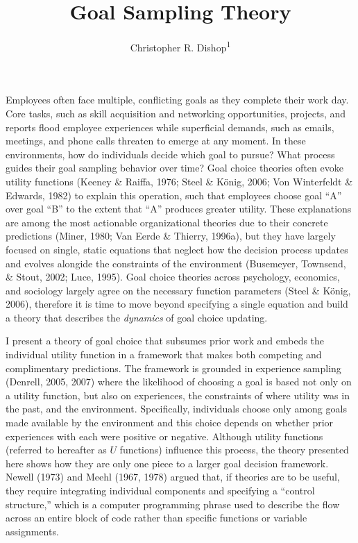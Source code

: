 \documentclass[english,,man]{apa6}
\title{Goal Sampling Theory}
\author{Christopher R. Dishop\textsuperscript{1}}
\date{}
\affiliation{
\vspace{0.5cm}
\textsuperscript{1} Michigan State University}
\theoremstyle{definition}
\theoremstyle{definition}
\theoremstyle{definition}
\theoremstyle{remark}
\begin{document}
\maketitle

Employees often face multiple, conflicting goals as they complete their
work day. Core tasks, such as skill acquisition and networking
opportunities, projects, and reports flood employee experiences while
superficial demands, such as emails, meetings, and phone calls threaten
to emerge at any moment. In these environments, how do individuals
decide which goal to pursue? What process guides their goal sampling
behavior over time? Goal choice theories often evoke utility functions
(Keeney \& Raiffa, 1976; Steel \& König, 2006; Von Winterfeldt \&
Edwards, 1982) to explain this operation, such that employees choose
goal \enquote{A} over goal \enquote{B} to the extent that \enquote{A}
produces greater utility. These explanations are among the most
actionable organizational theories due to their concrete predictions
(Miner, 1980; Van Eerde \& Thierry, 1996a), but they have largely
focused on single, static equations that neglect how the decision
process updates and evolves alongide the constraints of the environment
(Busemeyer, Townsend, \& Stout, 2002; Luce, 1995). Goal choice theories
across psychology, economics, and sociology largely agree on the
necessary function parameters (Steel \& König, 2006), therefore it is
time to move beyond specifying a single equation and build a theory that
describes the \emph{dynamics} of goal choice updating.

I present a theory of goal choice that subsumes prior work and embeds
the individual utility function in a framework that makes both competing
and complimentary predictions. The framework is grounded in experience
sampling (Denrell, 2005, 2007) where the likelihood of choosing a goal
is based not only on a utility function, but also on experiences, the
constraints of where utility was in the past, and the environment.
Specifically, individuals choose only among goals made available by the
environment and this choice depends on whether prior experiences with
each were positive or negative. Although utility functions (referred to
hereafter as \(U\) functions) influence this process, the theory
presented here shows how they are only one piece to a larger goal
decision framework. Newell (1973) and Meehl (1967, 1978) argued that, if
theories are to be useful, they require integrating individual
components and specifying a \enquote{control structure,} which is a
computer programming phrase used to describe the flow across an entire
block of code rather than specific functions or variable assignments.
\end{document}
